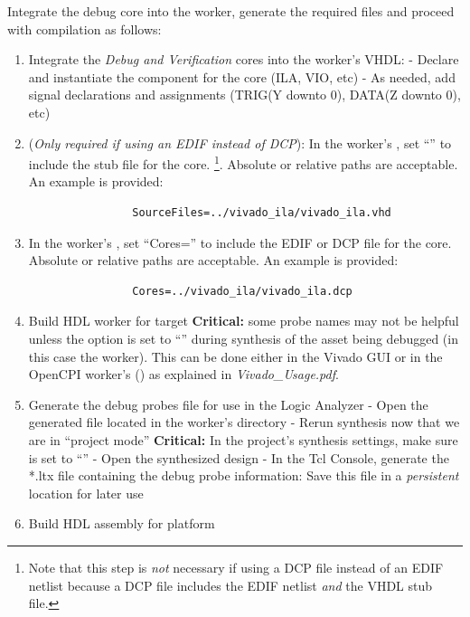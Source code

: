 \begin{flushleft}
Integrate the debug core into the worker, generate the required files and proceed with compilation as follows:
		\begin{enumerate}
			\item Integrate the \textit{Debug and Verification} cores into the worker's VHDL:
				\subitem - Declare and instantiate the component for the core (ILA, VIO, etc)
				\subitem - As needed, add signal declarations and assignments (TRIG(Y downto 0), DATA(Z downto 0), etc)
			\item (\textit{Only required if using an EDIF instead of DCP}):
			In the worker's , set ``'' to include the stub file for the core.
			\footnote{Note that this step is \textit{not} necessary if using a DCP file instead of an EDIF netlist because a DCP file includes the EDIF netlist \textit{and} the VHDL stub file.}.
			Absolute or relative paths are acceptable. An example is provided:
			\small\begin{verbatim}
				SourceFiles=../vivado_ila/vivado_ila.vhd
			\end{verbatim}
		 	\item In the worker's , set ``Cores='' to include the EDIF or DCP file for the core.
			Absolute or relative paths are acceptable. An example is provided:
		 	\small\begin{verbatim}
		 		Cores=../vivado_ila/vivado_ila.dcp
		 	\end{verbatim}
		 	\item Build HDL worker for target
				\subitem \textbf{Critical:} some probe names may not be helpful unless the  option is set to ``'' during synthesis of the asset being debugged (in this case the worker). This can be done either in the Vivado GUI or in the OpenCPI worker's  () as explained in \textit{Vivado\_Usage.pdf}.
			\item Generate the debug probes file for use in the Logic Analyzer
				\subitem - Open the generated  file located in the worker's  directory
				\subitem - Rerun synthesis now that we are in ``project mode''
					\subsubitem \textbf{Critical:} In the project's synthesis settings, make sure  is set to ``''
				\subitem - Open the synthesized design
				\subitem - In the Tcl Console, generate the *.ltx file containing the debug probe information:
			 		\subsubitem {}
					\subsubitem * Save this file in a \textit{persistent} location for later use
			\item Build HDL assembly for platform
		\end{enumerate}


\end{flushleft}
